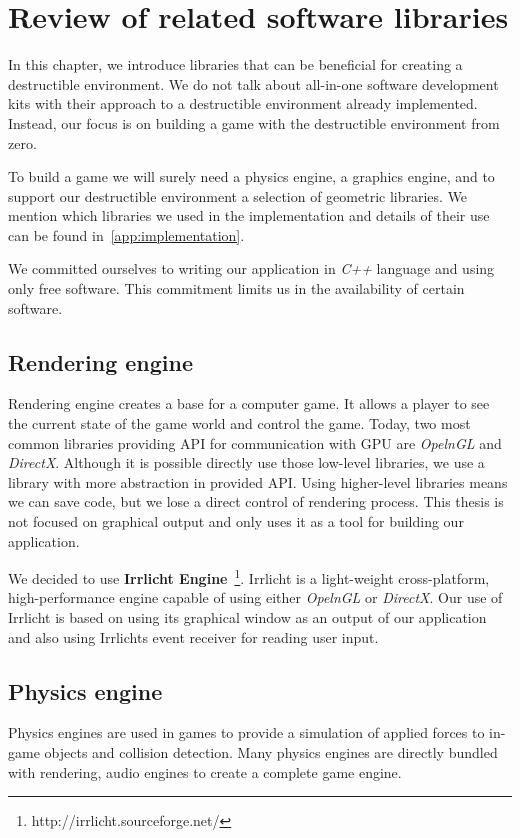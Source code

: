 \chapter{Review of related software libraries}
\label{chapt:technology}
In this chapter, we introduce libraries that can be beneficial for creating a destructible environment. We do not talk about all-in-one software development kits with their approach to a destructible environment already implemented. Instead, our focus is on building a game with the destructible environment from zero.  

To build a game we will surely need a physics engine, a graphics engine, and to support our destructible environment a selection of geometric libraries. We mention which libraries we used in the implementation and details of their use can be found in~\cref{app:implementation}.

We committed ourselves to writing our application in \emph{C++} language and using only free software. This commitment limits us in the availability of certain software. 

\section{Rendering engine}
Rendering engine creates a base for a computer game. It allows a player to see the current state of the game world and control the game. Today, two most common libraries providing API for communication with GPU are \emph{OpelnGL} and \emph{DirectX}. Although it is possible directly use those low-level libraries, we use a library with more abstraction in provided API. Using higher-level libraries means we can save code, but we lose a direct control of rendering process. This thesis is not focused on graphical output and only uses it as a tool for building our application.

We decided to use \textbf{Irrlicht Engine}~\footnote{http://irrlicht.sourceforge.net/}. Irrlicht is a light-weight cross-platform, high-performance engine capable of using either  \emph{OpelnGL} or \emph{DirectX}. Our use of Irrlicht is based on using its graphical window as an output of our application and also using Irrlichts event receiver for reading user input.

\section{Physics engine}
Physics engines are used in games to provide a simulation of applied forces to in-game objects and collision detection. Many physics engines are directly bundled with rendering, audio engines to create a complete game engine. 

